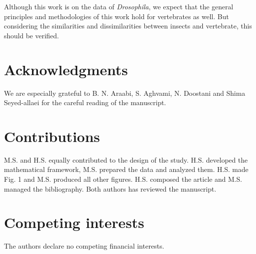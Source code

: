 \documentclass[11pt]{paper} %
\begin{document}
Although this work is on the data of \textit{Drosophila}, 
we expect that the general principles and methodologies of this work hold for vertebrates as well. 
But considering the similarities and dissimilarities between insects and vertebrate, 
this should be verified.


\section*{Acknowledgments}
We are especially grateful to B. N. Araabi, S. Aghvami, N. Doostani and Shima Seyed-allaei for the careful reading of the manuscript.

\printbibliography

%

%


\section*{Contributions}

M.S. and H.S. equally contributed to the design of the study. H.S. developed the mathematical framework, M.S. prepared the data and analyzed them. H.S. made Fig. 1 and M.S. produced all other figures. H.S. composed the article and M.S. managed the bibliography. Both authors has reviewed the manuscript.

\section*{Competing interests}
The authors declare no competing financial interests.
\end{document}
